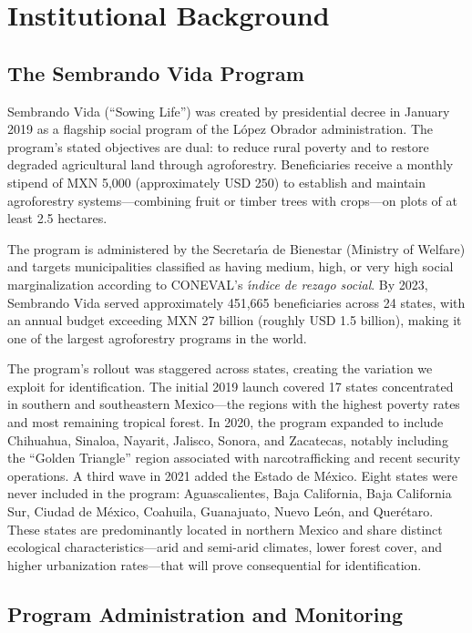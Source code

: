 \documentclass[12pt]{article}
\begin{document}
\section{Institutional Background}

\subsection{The Sembrando Vida Program}

Sembrando Vida (``Sowing Life'') was created by presidential decree in January 2019 as a flagship social program of the L\'{o}pez Obrador administration. The program's stated objectives are dual: to reduce rural poverty and to restore degraded agricultural land through agroforestry. Beneficiaries receive a monthly stipend of MXN 5,000 (approximately USD 250) to establish and maintain agroforestry systems---combining fruit or timber trees with crops---on plots of at least 2.5 hectares.

The program is administered by the Secretar\'{\i}a de Bienestar (Ministry of Welfare) and targets municipalities classified as having medium, high, or very high social marginalization according to CONEVAL's \textit{\'{\i}ndice de rezago social}. By 2023, Sembrando Vida served approximately 451,665 beneficiaries across 24 states, with an annual budget exceeding MXN 27 billion (roughly USD 1.5 billion), making it one of the largest agroforestry programs in the world.

The program's rollout was staggered across states, creating the variation we exploit for identification. The initial 2019 launch covered 17 states concentrated in southern and southeastern Mexico---the regions with the highest poverty rates and most remaining tropical forest. In 2020, the program expanded to include Chihuahua, Sinaloa, Nayarit, Jalisco, Sonora, and Zacatecas, notably including the ``Golden Triangle'' region associated with narcotrafficking and recent security operations. A third wave in 2021 added the Estado de M\'{e}xico. Eight states were never included in the program: Aguascalientes, Baja California, Baja California Sur, Ciudad de M\'{e}xico, Coahuila, Guanajuato, Nuevo Le\'{o}n, and Quer\'{e}taro. These states are predominantly located in northern Mexico and share distinct ecological characteristics---arid and semi-arid climates, lower forest cover, and higher urbanization rates---that will prove consequential for identification.

\subsection{Program Administration and Monitoring}
\end{document}
